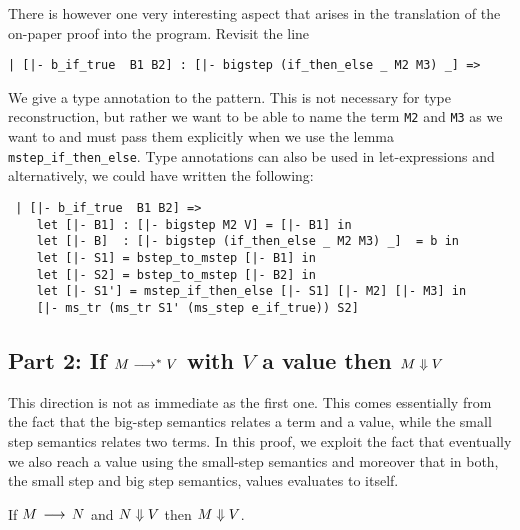 There is however one very interesting aspect that arises in the
translation of the on-paper proof into the program. Revisit the line

\begin{center}
\lstinline!| [|- b_if_true  B1 B2] : [|- bigstep (if_then_else _ M2 M3) _] =>!
\end{center}

We give a type annotation to the pattern. This is not necessary for
type reconstruction, but rather we want to be able to name the term
\lstinline!M2! and \lstinline!M3! as we want to and must pass them explicitly
when we use the lemma \lstinline!mstep_if_then_else!. Type annotations
can also be used in let-expressions and alternatively, we could have
written the following:

\begin{lstlisting}
 | [|- b_if_true  B1 B2] =>
    let [|- B1] : [|- bigstep M2 V] = [|- B1] in
    let [|- B]  : [|- bigstep (if_then_else _ M2 M3) _]  = b in
    let [|- S1] = bstep_to_mstep [|- B1] in
    let [|- S2] = bstep_to_mstep [|- B2] in
    let [|- S1'] = mstep_if_then_else [|- S1] [|- M2] [|- M3] in
    [|- ms_tr (ms_tr S1' (ms_step e_if_true)) S2]
\end{lstlisting}



\subsection{Part 2: If $M \longrightarrow^* V$ with $V$ a value then $M \Downarrow V$ }

This direction is not as immediate as the first one. This comes essentially from
the fact that the big-step semantics relates a term and a value, while the
small step semantics relates two terms. In this proof, we
exploit the fact that eventually we also reach a value using the
small-step semantics and moreover that in both, the small step and big
step semantics, values evaluates to itself.


\begin{lemma}\label{lem:step-bstep-to-bstep}
  If $M \mathrel{\,\longrightarrow\,} N$ and $N \Downarrow V$ then $M \Downarrow V$.
\end{lemma}

